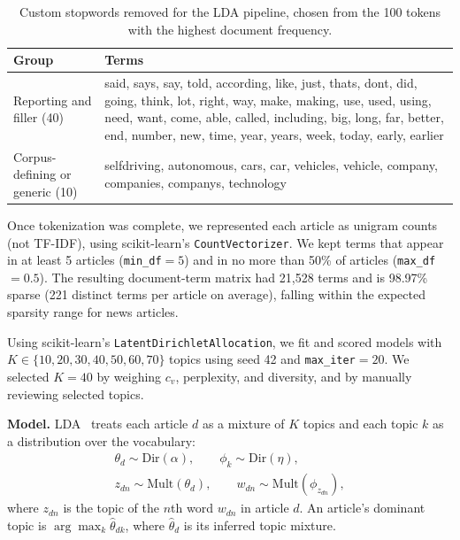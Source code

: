 \documentclass[conference]{IEEEtran}
\begin{document}
\begin{table}[H]
\caption{Custom stopwords removed for the LDA pipeline, chosen from the 100 tokens with the highest document frequency.}
\label{tab:stopwords}
\centering
\footnotesize
\begin{tabular}{@{}p{}p{}@{}}
\toprule
\textbf{Group} & \textbf{Terms} \\
\midrule
Reporting and filler (40) & said, says, say, told, according, like, just, thats, dont, did, going, think, lot, right, way, make, making, use, used, using, need, want, come, able, called, including, big, long, far, better, end, number, new, time, year, years, week, today, early, earlier \\
\addlinespace
Corpus-defining or generic (10) & selfdriving, autonomous, cars, car, vehicles, vehicle, company, companies, companys, technology \\
\bottomrule
\end{tabular}
\end{table}

Once tokenization was complete, we represented each article as unigram counts (not TF-IDF), using scikit-learn's \texttt{CountVectorizer}. We kept terms that appear in at least 5 articles (\texttt{min\_df}$=5$) and in no more than 50\% of articles (\texttt{max\_df}$=0.5$). The resulting document-term matrix had 21,528 terms and is 98.97\% sparse (221 distinct terms per article on average), falling within the expected sparsity range for news articles.

Using scikit-learn's \texttt{LatentDirichletAllocation}, we fit and scored models with $K\in\{10,20,30,40,50,60,70\}$ topics using seed 42 and \texttt{max\_iter}$=20$. We selected $K=40$ by weighing $c_v$, perplexity, and diversity, and by manually reviewing selected topics. 

\textbf{Model.} LDA~\cite{blei2003lda} treats each article $d$ as a mixture of $K$ topics and each topic $k$ as a distribution over the vocabulary:
\begin{equation}
\begin{gathered}
\theta_d \sim \mathrm{Dir}(\alpha), \qquad \phi_k \sim \mathrm{Dir}(\eta),\\
z_{dn} \sim \mathrm{Mult}(\theta_d), \qquad w_{dn} \sim \mathrm{Mult}(\phi_{z_{dn}}),
\end{gathered}
\label{eq:lda}
\end{equation}
where $z_{dn}$ is the topic of the $n$th word $w_{dn}$ in article $d$. An article's dominant topic is $\arg\max_k \hat{\theta}_{dk}$, where $\hat{\theta}_d$ is its inferred topic mixture.
\end{document}
